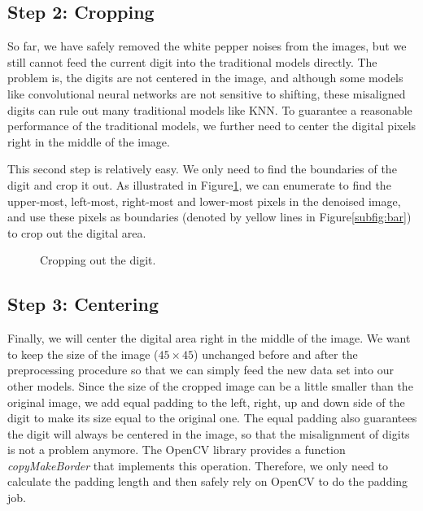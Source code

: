 \documentclass{article}
\begin{document}
\subsection{Step 2: Cropping}

So far, we have safely removed the white pepper noises from the images, but we still cannot feed the current digit into the traditional models directly. The problem is, the digits are not centered in the image, and although some models like convolutional neural networks are not sensitive to shifting, these misaligned digits can rule out many traditional models like KNN. To guarantee a reasonable performance of the traditional models, we further need to center the digital pixels right in the middle of the image.

This second step is relatively easy. We only need to find the boundaries of the digit and crop it out. As illustrated in Figure\ref{fig:crop}, we can enumerate to find the upper-most, left-most, right-most and lower-most pixels in the denoised image, and use these pixels as boundaries (denoted by yellow lines in Figure\ref{subfig:bar}) to crop out the digital area.

\begin{figure}[!htb]
	\centering
	\hspace{.2in}
	\caption{Cropping out the digit.}
	\label{fig:crop}
\end{figure}

\subsection{Step 3: Centering}
Finally, we will center the digital area right in the middle of the image. We want to keep the size of the image ($45\times 45$) unchanged before and after the preprocessing procedure so that we can simply feed the new data set into our other models. Since the size of the cropped image can be a little smaller than the original image, we add equal padding to the left, right, up and down side of the digit to make its size equal to the original one. The equal padding also guarantees the digit will always be centered in the image, so that the misalignment of digits is not a problem anymore. The OpenCV library provides a function \textit{copyMakeBorder} that implements this operation. Therefore, we only need to calculate the padding length and then safely rely on OpenCV to do the padding job. 
\end{document}

